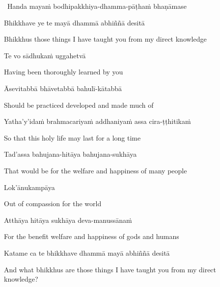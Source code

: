 \begin{leader}
  \anglebracketleft\ \hspace{-0.5mm}Handa mayaṁ bodhipakkhiya-dhamma-pāṭhaṁ bhaṇāmase \hspace{-0.5mm}\anglebracketright\
\end{leader}

Bhikkhave ye te mayā dhammā abhiññā desitā

\begin{english}
  Bhikkhus those things I have taught you from my direct knowledge
\end{english}

Te vo sādhukaṁ uggahetvā

\begin{english}
  Having been thoroughly learned by you
\end{english}

Āsevitabbā bhāvetabbā bahulī-kātabbā

\begin{english}
  Should be practiced developed and made much of
\end{english}

Yatha'y'idaṁ brahmacariyaṁ addhaniyaṁ assa cira-ṭṭhitikaṁ

\begin{english}
  So that this holy life may last for a long time
\end{english}

Tad'assa bahujana-hitāya bahujana-sukhāya

\begin{english}
  That would be for the welfare and happiness of many people
\end{english}

Lok'ānukampāya

\begin{english}
  Out of compassion for the world
\end{english}

Atthāya hitāya sukhāya deva-manussānaṁ

\begin{english}
  For the benefit welfare and happiness of gods and humans
\end{english}

Katame ca te bhikkhave dhammā mayā abhiññā desitā

\begin{english-hang}
  And what bhikkhus are those things I have taught you from my direct knowledge?
\end{english-hang}


